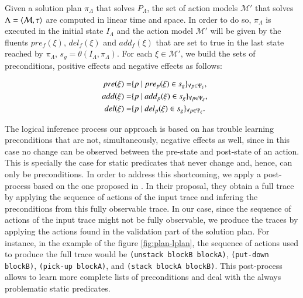 Given a solution plan $\pi_\Lambda$ that solves $P_{\Lambda}$, the set of action models $\mathcal{M}'$ that solves $\Lambda={\langle \mathcal{M},\tau \rangle}$ are computed in linear time and space. In order to do so, $\pi_\Lambda$ is executed in the initial state $I_{\Lambda}$ and the action model $\mathcal{M}'$ will be given by the fluents $pre_f(\xi)$, $del_f(\xi)$ and $add_f(\xi)$ that are set to true in the last state reached by $\pi_\Lambda$, $s_g=\theta(I_\Lambda,\pi_\Lambda)$. For each $\xi \in \mathcal{M'}$, we build the sets of preconditions, positive effects and negative effects as follows:


\begin{small}
	\begin{align*}
	\hspace*{7pt}pre(\xi)=& \{p ~|~ pre_p(\xi) \in s_g\}_{\forall p \in \Psi_\xi},\\
	\hspace*{7pt}add(\xi)=& \{p ~|~ add_p(\xi) \in s_g\}_{\forall p \in \Psi_\xi},\\
	\hspace*{7pt}del(\xi)=& \{p ~|~ del_p(\xi) \in s_g\}_{\forall p \in \Psi_\xi}.
	\end{align*}
\end{small}

The logical inference process our approach is based on has trouble learning preconditions that are not, simultaneously, negative effects as well, since in this case no change can be observed between the pre-state and post-state of an action. This is specially the case for static predicates that never change and, hence, can only be preconditions. In order to address this shortcoming, we apply a post-process based on the one proposed in \cite{kuvcera2018louga}. In their proposal, they obtain a full trace by applying the sequence of actions of the input trace and infering the preconditions from this fully observable trace. In our case, since the sequence of actions of the input trace might not be fully observable, we produce the traces by applying the actions found in the validation part of the solution plan. For instance, in the example of the figure \ref{fig:plan-lplan}, the sequence of actions used to produce the full trace would be {\tt{\small(unstack blockB blockA)}}, {\tt{\small(put-down blockB)}}, {\tt{\small(pick-up blockA)}}, and {\tt{\small(stack blockA blockB)}}. This post-process allows \FAMA to learn more complete lists of preconditions and deal with the always problematic static predicates.


